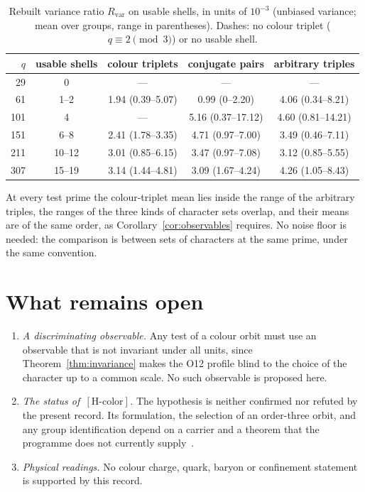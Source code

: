 \documentclass[12pt,a4paper]{article}
\theoremstyle{definition}
\theoremstyle{remark}
\newcommand{\Hcolor}{[\mathrm{H\text{-}color}]}
\newcommand{\Rvar}{R_{\mathrm{var}}}
\begin{document}
    \begin{table}[h]
      \centering
      \small
      \begin{tabular}{rcccc}
        \toprule
        $q$ & usable shells & colour triplets & conjugate pairs & arbitrary triples \\
        \midrule
        29 & 0 & --- & --- & --- \\
        61 & 1--2 & 1.94 (0.39--5.07) & 0.99 (0--2.20) & 4.06 (0.34--8.21) \\
        101 & 4 & --- & 5.16 (0.37--17.12) & 4.60 (0.81--14.21) \\
        151 & 6--8 & 2.41 (1.78--3.35) & 4.71 (0.97--7.00) & 3.49 (0.46--7.11) \\
        211 & 10--12 & 3.01 (0.85--6.15) & 3.47 (0.97--7.08) & 3.12 (0.85--5.55) \\
        307 & 15--19 & 3.14 (1.44--4.81) & 3.09 (1.67--4.24) & 4.26 (1.05--8.43) \\
        \bottomrule
      \end{tabular}
      \caption{Rebuilt variance ratio $\Rvar$ on usable shells, in units of $10^{-3}$ (unbiased variance; mean
      over groups, range in parentheses). Dashes: no colour triplet ($q\equiv2\pmod3$) or no usable shell.}
      \label{tab:rebuilt}
    \end{table}

    At every test prime the colour-triplet mean lies inside the range of the arbitrary triples, the ranges of
    the three kinds of character sets overlap, and their means are of the same order, as
    Corollary~\ref{cor:observables} requires.
    No noise floor is needed: the comparison is between sets of characters at the same prime, under the same
    convention.

  \section{What remains open}
  \label{sec:open}

  \begin{enumerate}
    \item \emph{A discriminating observable.}
    Any test of a colour orbit must use an observable that is not invariant under all units, since
    Theorem~\ref{thm:invariance} makes the O12 profile blind to the choice of the character up to a
    common scale.
    No such observable is proposed here.
    \item \emph{The status of~$\Hcolor$.}
    The hypothesis is neither confirmed nor refuted by the present record.
    Its formulation, the selection of an order-three orbit, and any group identification depend on
    a carrier and a theorem that the programme does not currently supply~\cite{Beau2026a35}.
    \item \emph{Physical readings.}
    No colour charge, quark, baryon or confinement statement is supported by this record.
  \end{enumerate}
\end{document}
